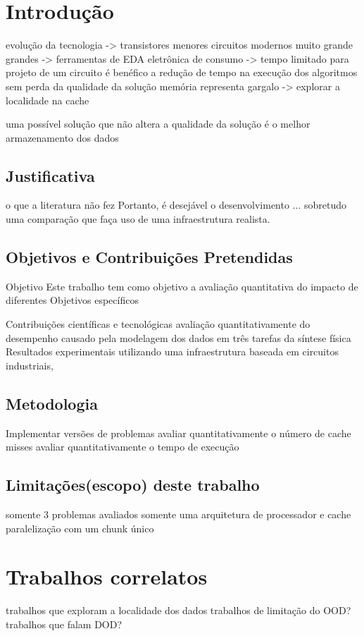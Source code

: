 \chapter{Introdução}
    evolução da tecnologia -> transistores menores
    circuitos modernos muito grande grandes -> ferramentas de EDA 
    eletrônica de consumo -> tempo limitado para projeto de um circuito
    é benéfico a redução de tempo na execução dos algoritmos sem perda da qualidade da solução 
    memória representa gargalo -> explorar a localidade na cache
    
    uma possível solução que não altera a qualidade da solução é o melhor armazenamento dos dados

    \section{Justificativa}
    o que a literatura não fez
    Portanto, é desejável o desenvolvimento ... sobretudo uma comparação que faça uso de uma infraestrutura realista.
    
    \section{Objetivos e Contribuições Pretendidas}
        Objetivo
            Este trabalho tem como objetivo a avaliação quantitativa do impacto de diferentes
        Objetivos específicos
        
        Contribuições científicas e tecnológicas
            avaliação quantitativamente do desempenho causado pela modelagem dos dados em três tarefas da síntese física
            Resultados experimentais utilizando uma infraestrutura baseada em circuitos industriais,

    \section{Metodologia}
        Implementar versões de problemas
        avaliar quantitativamente o número de cache misses
        avaliar quantitativamente o tempo de execução
        
    \section{Limitações(escopo) deste trabalho}
        somente 3 problemas avaliados
        somente uma arquitetura de processador e cache
        paralelização com um chunk único

\chapter{Trabalhos correlatos}
    trabalhos que exploram a localidade dos dados
    trabalhos de limitação do OOD?
    trabalhos que falam DOD?

